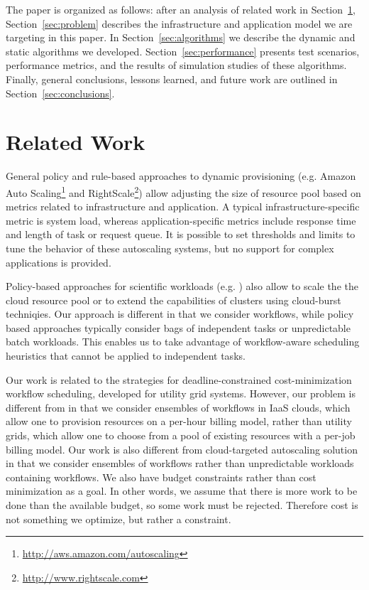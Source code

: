\documentclass{sig-alternate}
\begin{document}
The paper is organized as follows: after an analysis of related work in
Section~\ref{sec:related}, Section~\ref{sec:problem} describes the
infrastructure and application model we are targeting in this paper.
In Section~\ref{sec:algorithms} we describe the dynamic and
static algorithms we developed. Section~\ref{sec:performance} presents test
scenarios, performance metrics, and the results of simulation studies of these algorithms.
Finally, general conclusions, lessons learned, and future work are outlined in
Section~\ref{sec:conclusions}.

\section{Related Work}
\label{sec:related}
General policy and rule-based approaches to dynamic provisioning (e.g. Amazon
Auto Scaling\footnote{\url{http://aws.amazon.com/autoscaling}} and
RightScale\footnote{\url{http://www.rightscale.com}}) allow adjusting the size
of resource pool based on metrics related to infrastructure and application.
A typical infrastructure-specific metric is system load, whereas
application-specific metrics include response time and length of task or
request queue. It is possible to set thresholds and limits to tune the behavior
of these autoscaling systems, but no support for complex applications is provided.

Policy-based approaches for scientific workloads (e.g. \cite{Marshall2010,
Kim2011}) also allow to scale the the cloud resource pool or to extend the
capabilities of clusters using cloud-burst techniqies. Our approach is different
in that we consider workflows, while policy based approaches typically consider
bags of independent tasks or unpredictable batch workloads. This enables us to
take advantage of workflow-aware scheduling heuristics that cannot be applied to
independent tasks.


Our work is related to the strategies for deadline-constrained cost-minimization
workflow scheduling, developed for utility grid systems. However, our problem is
different from \cite{Yu2005, Abrishami2010} in that we consider ensembles of workflows in
IaaS clouds, which allow one to provision resources on a per-hour billing model,
rather than utility grids, which allow one to choose from a pool of existing
resources with a per-job billing model. Our work is also different from
cloud-targeted autoscaling solution~\cite{Mao2011} in that we consider ensembles
of workflows rather than unpredictable workloads containing workflows. We also have budget constraints
rather than cost minimization as a goal. In other words, we assume that there is
more work to be done than the available budget, so some work must be rejected.
Therefore cost is not something we optimize, but rather a constraint.
\end{document}
